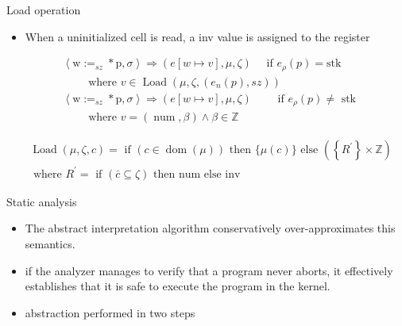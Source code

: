 \documentclass[aspectratio=169]{beamer}
\begin{document}
\begin{frame}{Load operation}
  \begin{itemize}
    \item When a uninitialized cell is read, a inv value is assigned to the register
  \end{itemize}
  \begin{align*}
     & \left\langle\mathrm{w}:=_{s z} * \mathrm{p}, \sigma\right\rangle \Rightarrow(e[w \mapsto v], \mu, \zeta) \quad \text{ if } e_\rho(p)=\text{stk}              \\
     & \qquad \text { where } v \in \operatorname{Load}\left(\mu, \zeta,\left(e_n(p), s z\right)\right)                                                             \\
     & \left\langle\mathrm{w}:=_{s z} * \mathrm{p}, \sigma\right\rangle \Rightarrow(e[w \mapsto v], \mu, \zeta) \quad \quad \text{ if } e_\rho(p) \neq \text{ stk } \\
     & \qquad \text { where } v=(\operatorname{num}, \beta) \wedge \beta \in \mathbb{Z}
  \end{align*}

  $$
    \begin{aligned}
       & \operatorname{Load}(\mu, \zeta, c)=\text { if }(c \in \operatorname{dom}(\mu)) \text { then }\{\mu(c)\} \text { else }\left(\left\{R^{\prime}\right\} \times \mathbb{Z}\right) \\
       & \text { where } R^{\prime}=\text { if }(\bar{c} \subseteq \zeta) \text { then num else inv }
    \end{aligned}
  $$
\end{frame}

\begin{frame}{Static analysis}
  \begin{itemize}
    \item The abstract interpretation algorithm conservatively over-approximates this semantics.
    \item if the analyzer manages to verify that a program never aborts, it effectively
          establishes that it is safe to execute the program in the kernel.
    \item abstraction performed in two steps
  \end{itemize}
\end{frame}
\end{document}
